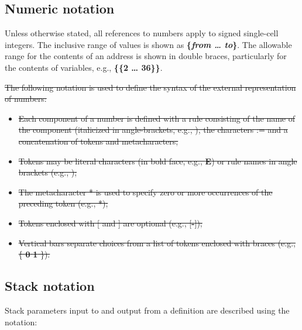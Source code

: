 
\subsection{Numeric notation}
\label{notation:numeric}

Unless otherwise stated, all references to numbers apply to signed
single-cell integers. The inclusive range of values is shown as
\textbf{\{\textit{from {\ldots} to}\}}. The allowable range for the
contents of an address is shown in double braces, particularly for
the contents of variables,
e.g.,  \textbf{\{\{2 {\ldots} 36\}\}}.

\cbstart{}
\sout{The following notation is used to define the syntax of the external
representation of numbers:}

\begin{itemize}
\item \sout{Each component of a number is defined with a rule consisting
	of the name of the component (italicized in angle-brackets,
	e.g., ), the characters \textsf{:=} and a concatenation
	of tokens and metacharacters;}

\item \sout{Tokens may be literal characters (in bold face, e.g.,
	\textbf{E}) or rule names in angle brackets (e.g.,
	\linebreak {});}

\item \sout{The metacharacter * is used to specify zero or more occurrences of
	the preceding token (e.g., *);}

\item \sout{Tokens enclosed with [ and ] are optional (e.g., [\textbf{-}]);}

\item \sout{Vertical bars separate choices from a list of tokens enclosed
	with braces (e.g., \{ \textbf{0} {\textbar} \textbf{1} \}).}
\end{itemize}
\cbend

\subsection{Stack notation}

Stack parameters input to and output from a definition are described
using the notation:
\begin{quote}
\end{quote}

